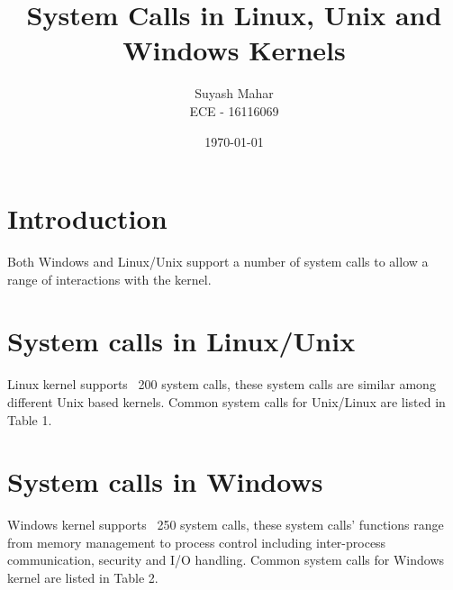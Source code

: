 \documentclass[a4,11pt]{article}
\title{System Calls in Linux, Unix and Windows Kernels}
\author{Suyash Mahar \\
  ECE - 16116069
}
\date{\today}
\begin{document}
\maketitle


\section{Introduction}
Both Windows and Linux/Unix support a number of system calls to
allow a range of interactions with the kernel.

\section{System calls in Linux/Unix}
Linux kernel supports ~200 system calls, these system calls are
similar among different Unix based kernels. Common system calls for
Unix/Linux are listed in Table 1.

\section{System calls in Windows}
Windows kernel supports ~250 system calls, these system calls'
functions range from memory management to process control including
inter-process communication, security and I/O handling. Common system
calls for Windows kernel are listed in Table 2.
\end{document}
